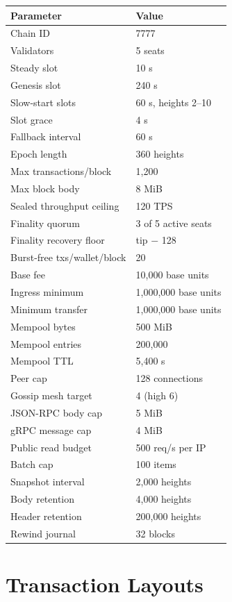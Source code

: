 \documentclass[11pt,a4paper]{article}
\begin{document}
\begin{center}
\begin{longtable}{@{}p{}p{}@{}}
\toprule
Parameter & Value \\
\midrule
Chain ID & 7777 \\
Validators & 5 seats \\
Steady slot & 10 s \\
Genesis slot & 240 s \\
Slow-start slots & 60 s, heights 2--10 \\
Slot grace & 4 s \\
Fallback interval & 60 s \\
Epoch length & 360 heights \\
Max transactions/block & 1,200 \\
Max block body & 8 MiB \\
Sealed throughput ceiling & 120 TPS \\
Finality quorum & 3 of 5 active seats \\
Finality recovery floor & tip $-$ 128 \\
Burst-free txs/wallet/block & 20 \\
Base fee & 10,000 base units \\
Ingress minimum & 1,000,000 base units \\
Minimum transfer & 1,000,000 base units \\
Mempool bytes & 500 MiB \\
Mempool entries & 200,000 \\
Mempool TTL & 5,400 s \\
Peer cap & 128 connections \\
Gossip mesh target & 4 (high 6) \\
JSON-RPC body cap & 5 MiB \\
gRPC message cap & 4 MiB \\
Public read budget & 500 req/s per IP \\
Batch cap & 100 items \\
Snapshot interval & 2,000 heights \\
Body retention & 4,000 heights \\
Header retention & 200,000 heights \\
Rewind journal & 32 blocks \\
\bottomrule
\end{longtable}
\end{center}

\section{Transaction Layouts}
\label{app:wire}
\end{document}
